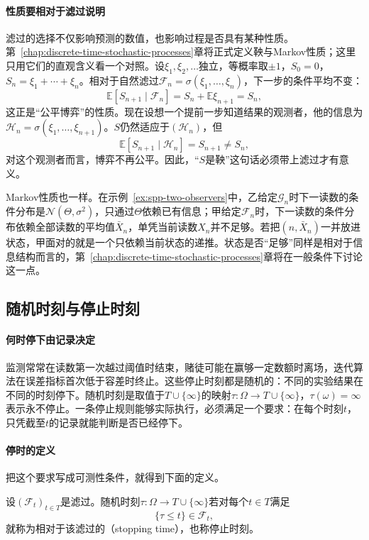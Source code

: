 \paragraph{性质要相对于滤过说明}
滤过的选择不仅影响预测的数值，也影响过程是否具有某种性质。第~\ref{chap:discrete-time-stochastic-processes}章将正式定义鞅与Markov性质；这里只用它们的直观含义看一个对照。设$\xi_1,\xi_2,\ldots$独立，等概率取$\pm1$，$S_0=0$，$S_n=\xi_1+\cdots+\xi_n$。相对于自然滤过$\mathcal F_n=\sigma(\xi_1,\ldots,\xi_n)$，下一步的条件平均不变：
\[
  \mathbb E[S_{n+1}\mid\mathcal F_n]=S_n+\mathbb E\xi_{n+1}=S_n ,
\]
这正是“公平博弈”的性质。现在设想一个提前一步知道结果的观测者，他的信息为$\mathcal H_n=\sigma(\xi_1,\ldots,\xi_{n+1})$。$S$仍然适应于$(\mathcal H_n)$，但
\[
  \mathbb E[S_{n+1}\mid\mathcal H_n]=S_{n+1}\ne S_n ,
\]
对这个观测者而言，博弈不再公平。因此，“$S$是鞅”这句话必须带上滤过才有意义。

Markov性质也一样。在示例~\ref{ex:spp-two-observers}中，乙给定$\mathcal G_n$时下一读数的条件分布是$\mathcal N(\Theta,\sigma^2)$，只通过$\Theta$依赖已有信息；甲给定$\mathcal F_n$时，下一读数的条件分布依赖全部读数的平均值$\bar X_n$，单凭当前读数$X_n$并不足够。若把$(n,\bar X_n)$一并放进状态，甲面对的就是一个只依赖当前状态的递推。状态是否“足够”同样是相对于信息结构而言的，第~\ref{chap:discrete-time-stochastic-processes}章将在一般条件下讨论这一点。

\subsection{随机时刻与停止时刻}
\label{sec:spp-stopping-times}

\paragraph{何时停下由记录决定}
监测常常在读数第一次越过阈值时结束，赌徒可能在赢够一定数额时离场，迭代算法在误差指标首次低于容差时终止。这些停止时刻都是随机的：不同的实验结果在不同的时刻停下。随机时刻是取值于$T\cup\{\infty\}$的映射$\tau:\Omega\to T\cup\{\infty\}$，$\tau(\omega)=\infty$表示永不停止。一条停止规则能够实际执行，必须满足一个要求：在每个时刻$t$，只凭截至$t$的记录就能判断是否已经停下。

\paragraph{停时的定义}
把这个要求写成可测性条件，就得到下面的定义。

\begin{definition}[停时]
\label{def:spp-stopping-time}
设$(\mathcal F_t)_{t\in T}$是滤过。随机时刻$\tau:\Omega\to T\cup\{\infty\}$若对每个$t\in T$满足
\[
  \{\tau\le t\}\in\mathcal F_t ,
\]
就称为相对于该滤过的（stopping time），也称停止时刻。
\end{definition}

